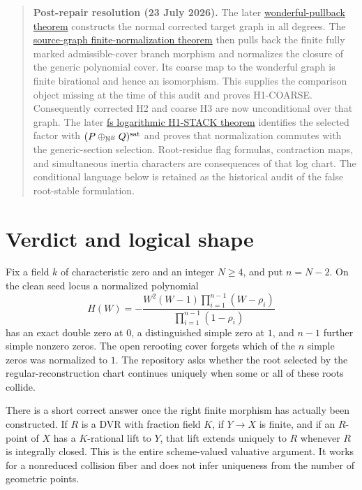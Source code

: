 \documentclass[11pt]{article}
\begin{document}
\begin{quote}
\textbf{Post-repair resolution (23 July 2026).}
The later
\href{../../extended-geometry/BRANCH_GRAPH_WONDERFUL_PULLBACK.md}
{wonderful-pullback theorem} constructs the normal corrected target graph in
all degrees.  The
\href{../../extended-geometry/SOURCE_GRAPH_FINITE_NORMALIZATION.md}
{source-graph finite-normalization theorem} then pulls back the finite fully
marked admissible-cover branch morphism and normalizes the closure of the
generic polynomial cover.  Its coarse map to the wonderful graph is finite
birational and hence an isomorphism.  This supplies the comparison object
missing at the time of this audit and proves H1-COARSE.  Consequently
corrected H2 and coarse H3 are now unconditional over that graph.  The later
\href{../../extended-geometry/RECURSIVE_RESONANCE_ATLAS.md}
{fs logarithmic H1-STACK theorem} identifies the selected factor with
\((P\oplus_{\mathbb N^E}Q)^{\rm sat}\) and proves that normalization
commutes with the generic-section selection.  Root-residue flag formulas,
contraction maps, and simultaneous inertia characters are consequences of
that log chart.  The conditional
language below is retained as the historical audit of the false root-stable
formulation.
\end{quote}

\tableofcontents

\section{Verdict and logical shape}

Fix a field $k$ of characteristic zero and an integer $N\geq 4$, and put
$n=N-2$.  On the clean seed locus a normalized polynomial
\[
 H(W)=-\frac{W^2(W-1)\prod_{i=1}^{n-1}(W-\rho_i)}
 {\prod_{i=1}^{n-1}(1-\rho_i)}
\]
has an exact double zero at $0$, a distinguished simple zero at $1$, and
$n-1$ further simple nonzero zeros.  The open rerooting cover forgets which
of the $n$ simple zeros was normalized to $1$.  The repository asks whether
the root selected by the regular-reconstruction chart continues uniquely
when some or all of these roots collide.

There is a short correct answer once the right finite morphism has actually
been constructed.  If $R$ is a DVR with fraction field $K$, if
$Y\to X$ is finite, and if an $R$-point of $X$ has a $K$-rational lift to
$Y$, that lift extends uniquely to $R$ whenever $R$ is integrally closed.
This is the entire scheme-valued valuative argument.  It works for a
nonreduced collision fiber and does not infer uniqueness from the number of
geometric points.
\end{document}
